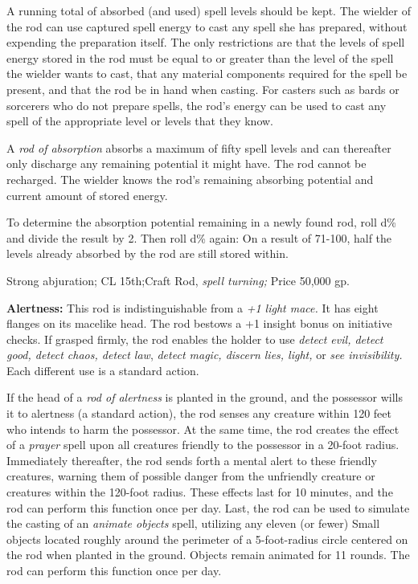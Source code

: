 A running total of absorbed (and used) spell levels should be kept. The wielder 
of the rod can use captured spell energy to cast any spell she has prepared, without 
expending the preparation itself. The only restrictions are that the levels of 
spell energy stored in the rod must be equal to or greater than the level of the 
spell the wielder wants to cast, that any material components required for the 
spell be present, and that the rod be in hand when casting. For casters such as 
bards or sorcerers who do not prepare spells, the rod's energy can be used to cast 
any spell of the appropriate level or levels that they know.

A \textit{rod of absorption }absorbs a maximum of fifty spell levels and can thereafter 
only discharge any remaining potential it might have. The rod cannot be recharged. 
The wielder knows the rod's remaining absorbing potential and current amount of 
stored energy.

To determine the absorption potential remaining in a newly found rod, roll d\% 
and divide the result by 2. Then roll d\% again: On a result of 71-100, half the 
levels already absorbed by the rod are still stored within.

Strong abjuration; CL 15th;Craft Rod, \textit{spell turning; }Price 50,000 gp.

\textbf{Alertness:} This rod is indistinguishable from a \textit{+1 light mace. 
}It has eight flanges on its macelike head. The rod bestows a +1 insight bonus 
on initiative checks. If grasped firmly, the rod enables the holder to use \textit{detect 
evil, detect good, detect chaos, detect law}, \textit{detect magic, discern lies, 
light, }or \textit{see invisibility. }Each different use is a standard action.

If the head of a \textit{rod of alertness }is planted in the ground, and the possessor 
wills it to alertness (a standard action), the rod senses any creature within 120 
feet who intends to harm the possessor. At the same time, the rod creates the effect 
of a \textit{prayer }spell upon all creatures friendly to the possessor in a 20-foot 
radius. Immediately thereafter, the rod sends forth a mental alert to these friendly 
creatures, warning them of possible danger from the unfriendly creature or creatures 
within the 120-foot radius. These effects last for 10 minutes, and the rod can 
perform this function once per day. Last, the rod can be used to simulate the casting 
of an \textit{animate objects }spell, utilizing any eleven (or fewer) Small objects 
located roughly around the perimeter of a 5-foot-radius circle centered on the 
rod when planted in the ground. Objects remain animated for 11 rounds. The rod 
can perform this function once per day.


